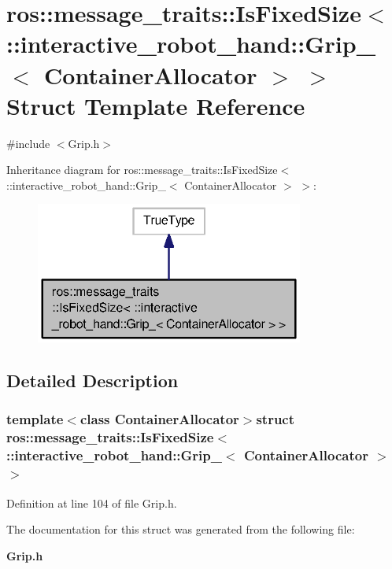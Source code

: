 \section{ros\-:\-:message\-\_\-traits\-:\-:Is\-Fixed\-Size$<$ \-:\-:interactive\-\_\-robot\-\_\-hand\-:\-:Grip\-\_\-$<$ Container\-Allocator $>$ $>$ Struct Template Reference}
\label{structros_1_1message__traits_1_1IsFixedSize_3_01_1_1interactive__robot__hand_1_1Grip___3_01ContainerAllocator_01_4_01_4}


{\ttfamily \#include $<$Grip.\-h$>$}



Inheritance diagram for ros\-:\-:message\-\_\-traits\-:\-:Is\-Fixed\-Size$<$ \-:\-:interactive\-\_\-robot\-\_\-hand\-:\-:Grip\-\_\-$<$ Container\-Allocator $>$ $>$\-:\nopagebreak
\begin{figure}[H]
\begin{center}
\leavevmode
\includegraphics[width=250pt]{structros_1_1message__traits_1_1IsFixedSize_3_01_1_1interactive__robot__hand_1_1Grip___3_01Contaf8402a35adece2acec8cf397a1499653}
\end{center}
\end{figure}


\subsection{Detailed Description}
\subsubsection*{template$<$class Container\-Allocator$>$struct ros\-::message\-\_\-traits\-::\-Is\-Fixed\-Size$<$ \-::interactive\-\_\-robot\-\_\-hand\-::\-Grip\-\_\-$<$ Container\-Allocator $>$ $>$}



Definition at line 104 of file Grip.\-h.



The documentation for this struct was generated from the following file\-:\begin{DoxyCompactItemize}
\item 
{\bf Grip.\-h}\end{DoxyCompactItemize}
